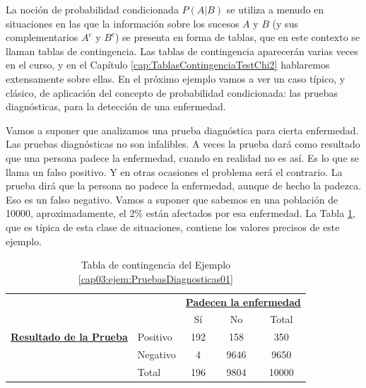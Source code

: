     La noción de probabilidad condicionada $P(A|B)$ se utiliza a menudo en situaciones en las que la información sobre los sucesos $A$ y $B$ (y sus complementarios $A^c$ y $B^c$) se presenta en forma de tablas, que en este contexto se llaman {\sf tablas de contingencia}. Las tablas de contingencia aparecerán varias veces en el curso, y en el Capítulo \ref{cap:TablasContingenciaTestChi2} hablaremos extensamente sobre ellas. En el próximo ejemplo vamos a ver un caso típico, y clásico, de aplicación del concepto de probabilidad condicionada: las {\sf pruebas diagnósticas}, para la detección de una enfermedad.
\begin{ejemplo}
\label{cap03:ejem:PruebasDiagnosticas01}
           Vamos a suponer que analizamos una prueba diagnóstica para cierta enfermedad. Las pruebas diagnósticas no son infalibles. A veces la prueba dará como resultado que una persona padece la enfermedad, cuando en realidad no es así. Es lo que se llama un {\sf falso positivo}. Y en otras ocasiones el problema será el contrario. La prueba dirá que la persona no padece la enfermedad, aunque de hecho la padezca. Eso es un {\sf falso negativo}. Vamos a suponer que sabemos en una población de 10000, aproximadamente, el 2\% están afectados por esa enfermedad. La Tabla \ref{cap03:tabla:ejemploPruebasDiagnosticas}, que es típica de esta clase de situaciones, contiene los valores precisos de este ejemplo.
        \begin{table}[h!]
        \begin{center}
            \begin{tabular}{llccc}
            &&\multicolumn{3}{c}{\underline{\bf Padecen la enfermedad}}\\

                                      &          & Sí &  No & Total\\
            \hline
          \underline{\bf Resultado de la Prueba} & Positivo & 192&  158&   350\\
                                      & Negativo &  4 & 9646&  9650\\
            \hline
                                      & Total    & 196& 9804& 10000\\
            \hline
            \end{tabular}
        \end{center}
        \caption{Tabla de contingencia del Ejemplo \ref{cap03:ejem:PruebasDiagnosticas01}}
        \label{cap03:tabla:ejemploPruebasDiagnosticas}
        \end{table}


\end{ejemplo}
